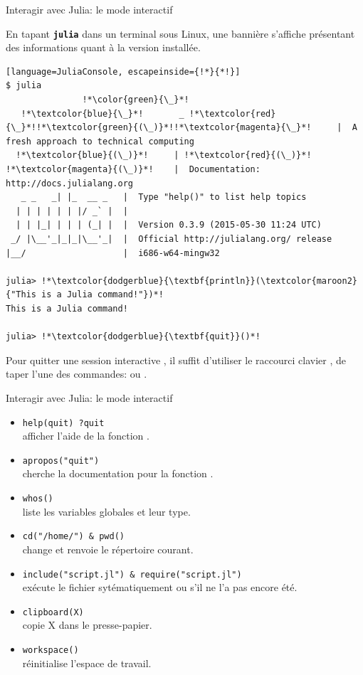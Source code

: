 \begin{frame}[containsverbatim]{Interagir avec Julia: le mode interactif}
\par{En tapant \textcolor{maroon2}{\texttt{\textbf{julia}}} dans un terminal sous Linux, une bannière s'affiche présentant des informations quant à la version installée.}
\begin{lstlisting}[language=JuliaConsole, escapeinside={!*}{*!}]
$ julia
               !*\color{green}{\_}*!
   !*\textcolor{blue}{\_}*!       _ !*\textcolor{red}{\_}*!!*\textcolor{green}{(\_)}*!!*\textcolor{magenta}{\_}*!     |  A fresh approach to technical computing
  !*\textcolor{blue}{(\_)}*!     | !*\textcolor{red}{(\_)}*! !*\textcolor{magenta}{(\_)}*!    |  Documentation: http://docs.julialang.org
   _ _   _| |_  __ _   |  Type "help()" to list help topics
  | | | | | | |/ _` |  |
  | | |_| | | | (_| |  |  Version 0.3.9 (2015-05-30 11:24 UTC)
 _/ |\__'_|_|_|\__'_|  |  Official http://julialang.org/ release
|__/                   |  i686-w64-mingw32

julia> !*\textcolor{dodgerblue}{\textbf{println}}(\textcolor{maroon2}{"This is a Julia command!"})*!
This is a Julia command!

julia> !*\textcolor{dodgerblue}{\textbf{quit}}()*!
\end{lstlisting}
\par{Pour quitter une session interactive {\Julia}, il suffit d'utiliser le raccourci clavier , de taper l'une des commandes:  ou .}
\end{frame}


\begin{frame}[containsverbatim]{Interagir avec Julia: le mode interactif}
\begin{itemize}
\item \texttt{help(quit) ?quit} \\\qquad afficher l'aide de la fonction .
\item \texttt{apropos("quit")} \\\qquad cherche la documentation pour la fonction .
\item \texttt{whos()} \\\qquad liste les variables globales et leur type.
\item \texttt{cd("/home/") \& pwd()} \\\qquad change et renvoie le répertoire courant.
\item \texttt{include("script.jl") \& require("script.jl")} \\\qquad exécute le fichier sytématiquement ou s'il ne l'a pas encore été.
\item \texttt{clipboard(X)} \\\qquad copie X dans le presse-papier.
\item \texttt{workspace()} \\\qquad réinitialise l'espace de travail.
\end{itemize}
\end{frame}

